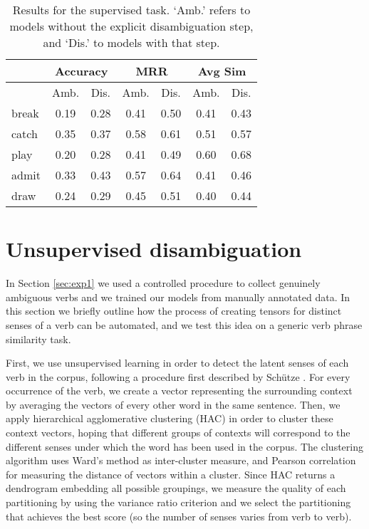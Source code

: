 \documentclass[11pt]{article}
\begin{document}
\begin{table}[t]
  \small
  \centering
  \begin{tabular}{l|cc|cc|cc}
    \hline
     & \multicolumn{2}{|c|}{\textbf{Accuracy}} & \multicolumn{2}{|c|}{\textbf{MRR}} & \multicolumn{2}{|c}{\textbf{Avg Sim}} \\
    \hline\hline
     & Amb. & Dis. & Amb. & Dis. & Amb. & Dis. \\
    \hline\hline
    break & 0.19 & 0.28 & 0.41 & 0.50 & 0.41 & 0.43 \\
    catch & 0.35 & 0.37 & 0.58 & 0.61 & 0.51 & 0.57 \\
    play  & 0.20 & 0.28 & 0.41 & 0.49 & 0.60 & 0.68 \\
    admit & 0.33 & 0.43 & 0.57 & 0.64 & 0.41 & 0.46 \\
    draw  & 0.24 & 0.29 & 0.45 & 0.51 & 0.40 & 0.44 \\
    \hline
  \end{tabular}
  \caption{Results for the supervised task. `Amb.' refers to models without the explicit disambiguation step, and `Dis.' to models with that step.}
  \label{tbl:exp1results}
  \normalsize
\end{table}

\section{Unsupervised disambiguation}
\label{sec:exp2}

In Section \ref{sec:exp1} we used a controlled procedure to collect genuinely ambiguous verbs and we trained our models from manually annotated data. In this section we briefly outline how the process of creating tensors for distinct senses of a verb can be automated, and we test this idea on a generic verb phrase similarity task. 

First, we use unsupervised learning in order to detect the latent senses of each verb in the corpus, following a procedure first described by Sch\"utze . For every occurrence of the verb, we create a vector representing the surrounding context by averaging the vectors of every other word in the same sentence. Then, we apply hierarchical agglomerative clustering (HAC) in order to cluster these context vectors, hoping that different groups of contexts will correspond to the different senses under which the word has been used in the corpus. The clustering algorithm uses Ward's method as inter-cluster measure, and Pearson correlation for measuring the distance of vectors within a cluster. Since HAC returns a dendrogram embedding all possible groupings, we measure the quality of each partitioning by using the variance ratio criterion \cite{calinski1974} and we select the partitioning that achieves the best score (so the number of  senses varies from verb to verb). 
\end{document}
